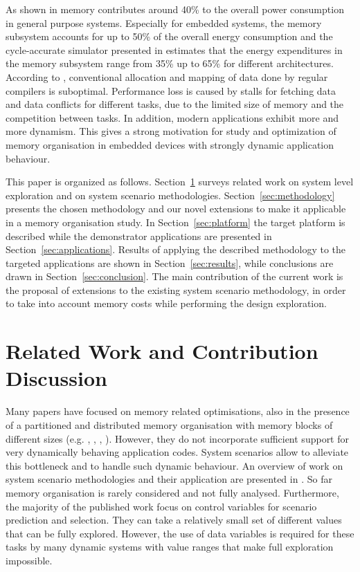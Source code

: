 As shown in \cite{Gonzalez1996} memory contributes around 40\% to the overall power consumption in general purpose systems. Especially for embedded systems, the memory subsystem accounts for up to 50\% of the overall energy consumption \cite{Che09} and the cycle-accurate simulator presented in \cite{Ben99} estimates that the energy expenditures in the memory subsystem range from 35\% up to 65\% for different architectures. According to \cite{tcm}, conventional allocation and mapping of data done by regular compilers is suboptimal. Performance loss is caused by stalls for fetching data and data conflicts for different tasks, due to the limited size of memory and the competition between tasks. In addition, modern applications exhibit more and more dynamism. This gives a strong motivation for study and optimization of memory organisation in embedded devices with strongly dynamic application behaviour.

This paper is organized as follows. Section~\ref{sec:related} surveys related work on system level exploration and on system scenario methodologies. Section~\ref{sec:methodology} presents the chosen methodology and our novel extensions to make it applicable in a memory organisation study. In Section~\ref{sec:platform} the target platform is described while the demonstrator applications are presented in Section~\ref{sec:applications}. Results of applying the described methodology to the targeted applications are shown in Section~\ref{sec:results}, while conclusions are drawn in Section~\ref{sec:conclusion}. The main contribution of the current work is the proposal of extensions to the existing system scenario methodology, in order to take into account memory costs while performing the design exploration.  

\section{Related Work and Contribution Discussion}
\label{sec:related}

Many papers have focused on memory related optimisations, also in the presence of a partitioned and distributed memory organisation with memory blocks of different sizes (e.g. \cite{Ben00b}, \cite{Ben00c}, \cite{Mac02}, \cite{Pgk01}). However, they do not incorporate sufficient support for very dynamically behaving application codes. System scenarios allow to alleviate this bottleneck and to handle such dynamic behaviour. An overview of work on system scenario methodologies and their application are presented in \cite{Gheorghita2007}. So far memory organisation is rarely considered and not fully analysed. Furthermore, the majority of the published work focus on control variables for scenario prediction and selection. They can take a relatively small set of different values that can be fully explored. However, the use of data variables \cite{Elena2010} is required for these tasks by many dynamic systems with value ranges that make full exploration impossible. 

